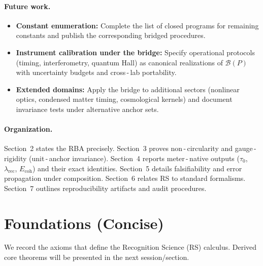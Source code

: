 \documentclass[11pt]{article}
\newcommand{\lamrec}{\lambda_{\mathrm{rec}}}
\newcommand{\tauzero}{\tau_{0}}
\newcommand{\Ecoh}{E_{\mathrm{coh}}}
\theoremstyle{remark}
\begin{document}
\paragraph{Future work.}
\begin{itemize}
  \item \textbf{Constant enumeration:} Complete the list of closed programs for remaining constants and publish the corresponding bridged procedures.
  \item \textbf{Instrument calibration under the bridge:} Specify operational protocols (timing, interferometry, quantum Hall) as canonical realizations of $\mathcal B(P)$ with uncertainty budgets and cross\,\mbox{-}\,lab portability.
  \item \textbf{Extended domains:} Apply the bridge to additional sectors (nonlinear optics, condensed matter timing, cosmological kernels) and document invariance tests under alternative anchor sets.
\end{itemize}

\paragraph{Organization.} Section~2 states the RBA precisely. Section~3 proves
non\,\mbox{-}\,circularity and gauge\,\mbox{-}\,rigidity (unit\,\mbox{-}\,anchor invariance). Section~4 reports meter\,\mbox{-}\,native
outputs ($\tauzero$, $\lamrec$, $\Ecoh$) and their exact identities. Section~5 details
falsifiability and error propagation under composition. Section~6 relates RS to
standard formalisms. Section~7 outlines reproducibility artifacts and audit
procedures.

\section{Foundations (Concise)}
We record the axioms that define the Recognition Science (RS) calculus. Derived
core theorems will be presented in the next session/section.
\end{document}
